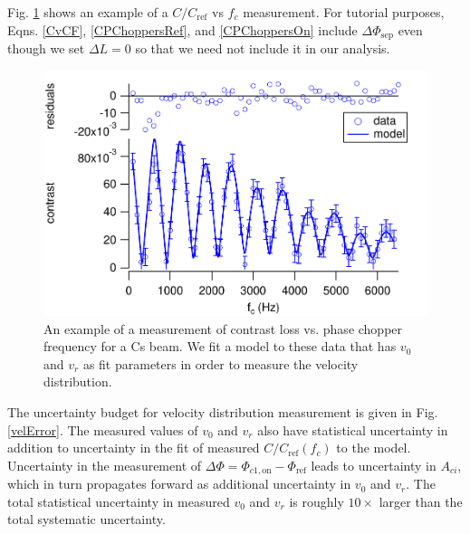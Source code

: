 \documentclass[twocolumn,prl,showpacs,superscriptaddress]{revtex4-1}   %
\newcommand{\figref}[1]{Fig. \ref{#1}}
\newcommand{\dphisep}{\Delta\Phi_{\mathrm{sep}}}
\begin{document}
\figref{CvCFExample} shows an example of a $C/C_{\mathrm{ref}}$ vs $f_c$ measurement. 
For tutorial purposes, Eqns. \eqref{CvCF}, \eqref{CPChoppersRef}, and \eqref{CPChoppersOn} include $\dphisep$ even though we set $\Delta L = 0$ so that we need not include it in our analysis.

\begin{figure}
\includegraphics[width=\linewidth,keepaspectratio]{CvCF_150420_o.pdf}
\caption{\label{CvCFExample}An example of a measurement of contrast loss vs. phase chopper frequency for a Cs beam. We fit a model to these data that has $v_0$ and $v_r$ as fit parameters in order to measure the velocity distribution.}
\end{figure}
	
The uncertainty budget for velocity distribution measurement is given in \figref{velError}. The measured values of $v_0$ and $v_r$ also have statistical uncertainty in addition to uncertainty in the fit of measured $C/C_{\mathrm{ref}}(f_c)$ to the model. Uncertainty in the measurement of $\Delta\Phi = \Phi_{c1,\mathrm{on}} - \Phi_{\mathrm{ref}}$ leads to uncertainty in $A_{ci}$, which in turn propagates forward as additional uncertainty in $v_0$ and $v_r$. The total statistical uncertainty in measured $v_0$ and $v_r$ is roughly $10\times$ larger than the total systematic uncertainty.
\end{document}
